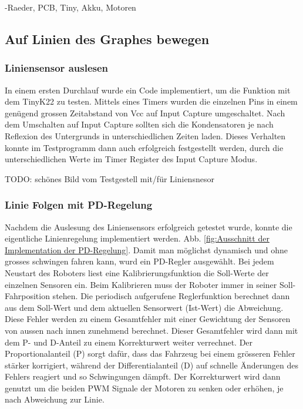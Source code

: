 -Raeder, PCB, Tiny, Akku, Motoren


\newpage

\subsection{Auf Linien des Graphes bewegen}

\subsubsection{Liniensensor auslesen}

In einem ersten Durchlauf wurde ein Code implementiert, um die Funktion mit dem TinyK22 zu testen. Mittels eines Timers wurden die einzelnen Pins in einem genügend grossen Zeitabstand von Vcc auf Input Capture umgeschaltet. Nach dem Umschalten auf Input Capture sollten sich die Kondensatoren je nach Reflexion des Untergrunds in unterschiedlichen Zeiten laden. Dieses Verhalten konnte im Testprogramm dann auch erfolgreich festgestellt werden, durch die unterschiedlichen Werte im Timer Register des Input Capture Modus.


TODO: schönes Bild vom Testgestell mit/für Liniensnesor

\subsubsection{Linie Folgen mit PD-Regelung}

Nachdem die Auslesung des Liniensensors erfolgreich getestet wurde, konnte die eigentliche Linienregelung implementiert werden. Abb. \ref{fig:Ausschnitt der Implementation der PD-Regelung}. Damit man möglichst dynamisch und ohne grosses schwingen fahren kann, wurd ein PD-Regler ausgewählt. Bei jedem Neustart des Roboters liest eine Kalibrierungsfunktion die Soll-Werte der einzelnen Sensoren ein. Beim Kalibrieren muss der Roboter immer in seiner Soll-Fahrposition stehen. Die periodisch aufgerufene Reglerfunktion berechnet dann aus dem Soll-Wert und dem aktuellen Sensorwert (Ist-Wert) die Abweichung. Diese Fehler werden zu einem Gesamtfehler mit einer Gewichtung der Sensoren von aussen nach innen zunehmend berechnet. Dieser Gesamtfehler wird dann mit dem P- und D-Anteil zu einem Korrekturwert weiter verrechnet. Der Proportionalanteil (P) sorgt dafür, dass das Fahrzeug bei einem grösseren Fehler stärker korrigiert, während der Differentialanteil (D) auf schnelle Änderungen des Fehlers reagiert und so Schwingungen dämpft. Der Korrekturwert wird dann genutzt um die beiden PWM Signale der Motoren zu senken oder erhöhen, je nach Abweichung zur Linie.

